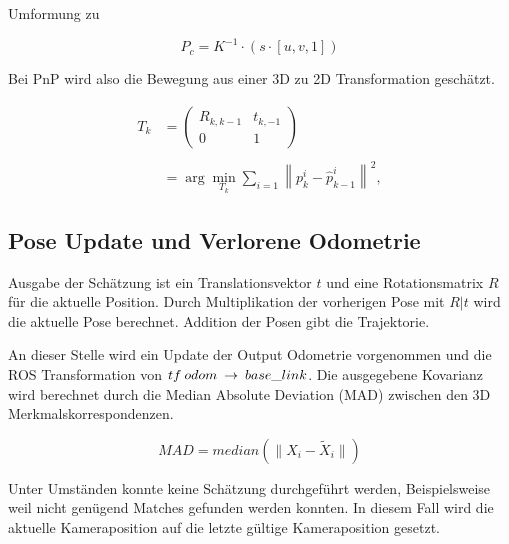 Umformung zu 

\begin{equation}
  P_c = K^{-1} \cdot (s \cdot [u, v, 1])
\end{equation}

Bei PnP wird also die Bewegung aus einer 3D zu 2D Transformation geschätzt.

\begin{equation}
\label{eq:tmatrix}
  \begin{split}
T_{k} &= 
    \begin{pmatrix}
    R_{k,k-1} & t_{k,-1}\\
    0 & 1
    \end{pmatrix} \\
    \\
    &= \arg\min_{T_{k}} \sum_{i=1} \left\|p_{k}^i - \hat{p}_{k-1}^i \right\|^2,
  \end{split}
\end{equation}
%

%
\subsection{Pose Update und Verlorene Odometrie}
Ausgabe der Schätzung ist ein Translationsvektor $t$ und eine Rotationsmatrix $R$ für die aktuelle Position. Durch Multiplikation der vorherigen Pose mit $R|t$ wird die aktuelle Pose berechnet. Addition der Posen gibt die Trajektorie.

An dieser Stelle wird ein Update der Output Odometrie vorgenommen und die ROS Transformation von $tf\: \/odom\: \rightarrow\: \/base\_link$. Die ausgegebene Kovarianz wird berechnet durch die Median Absolute Deviation (MAD) zwischen den 3D Merkmalskorrespondenzen.

\begin{equation}
  MAD = median (\|X_i - \tilde{X}_i \|)
\end{equation}

Unter Umständen konnte keine Schätzung durchgeführt werden, Beispielsweise weil nicht genügend Matches gefunden werden konnten. In diesem Fall wird die aktuelle Kameraposition auf die letzte gültige Kameraposition gesetzt.